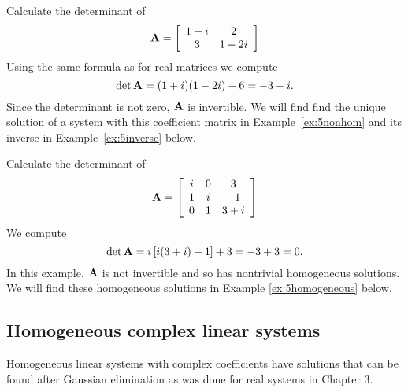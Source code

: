 \begin{example}
\label{ex:5det2} 
Calculate the determinant of 
\[
{\bf A} = \left[ \begin{array}{cc} 1+i & 2 \\ 3 & 1-2i \end{array} \right]
\] 
Using the same formula as for real matrices we compute 
\[
\det {\bf A} = (1+i)(1-2i) - 6  = -3-i.
\]
Since the determinant is not zero, $\bf A$ is invertible. We will find find the unique solution of a system with this coefficient matrix in Example~\ref{ex:5nonhom} and its inverse in Example~\ref{ex:5inverse} below. 
\end{example} 

\begin{example}
\label{ex:5det3} 
Calculate the determinant of 
\[
{\bf A} = \left[ \begin{array}{ccc} i & 0 & 3 \\ 1 & i & -1 \\ 0 & 1 & 3+i \end{array} \right]
\]
We compute 
\[
\det {\bf A} = i \left[ i (3+i) +1 \right] + 3 = -3 +3 = 0.
\]
In this example, $\bf A$ is not invertible and so has nontrivial homogeneous solutions. We will find these homogeneous solutions in Example \ref{ex:5homogeneous} below. 
\end{example}

\subsection{Homogeneous complex linear systems}

Homogeneous linear systems with complex coefficients have solutions that can be found after Gaussian elimination as was done for real systems in Chapter 3. 

